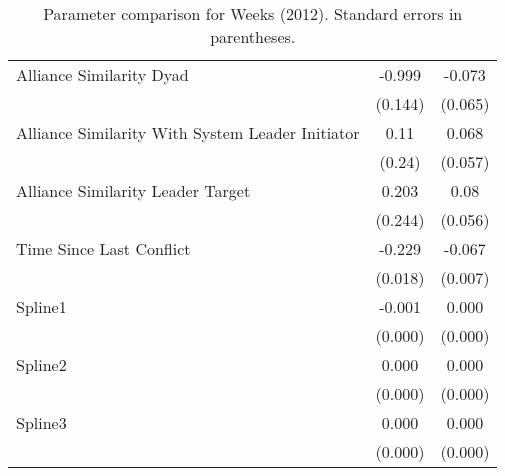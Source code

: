 \begin{table}[ht]
\begin{tabular}{lcc}
  Alliance Similarity Dyad  & -0.999 & -0.073 \\ 
   & (0.144) & (0.065) \\ 
  Alliance Similarity With System Leader Initiator & 0.11 & 0.068 \\ 
   & (0.24) & (0.057) \\ 
  Alliance Similarity Leader Target & 0.203 & 0.08 \\ 
   & (0.244) & (0.056) \\ 
  Time Since Last Conflict & -0.229 & -0.067 \\ 
   & (0.018) & (0.007) \\ 
  Spline1 & -0.001 & 0.000 \\ 
   & (0.000) & (0.000) \\ 
  Spline2 & 0.000 & 0.000 \\ 
   & (0.000) & (0.000) \\ 
  Spline3 & 0.000 & 0.000 \\ 
   & (0.000) & (0.000) \\ 
   \hline
\hline
\end{tabular}
\endgroup
\caption{Parameter comparison for Weeks (2012). Standard errors in parentheses.} 
\label{tab:weeks_coef}
\end{table}
